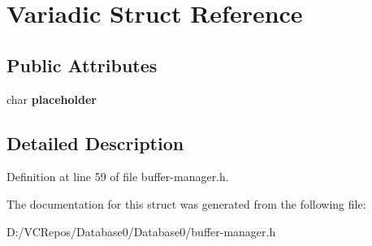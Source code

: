 \hypertarget{struct_variadic}{}\section{Variadic Struct Reference}
\label{struct_variadic}
\subsection*{Public Attributes}
\begin{DoxyCompactItemize}
\item 
\mbox{\label{struct_variadic_a3b8707a90647c818a4d618225f72ed34}} 
char {\bfseries placeholder}
\end{DoxyCompactItemize}


\subsection{Detailed Description}


Definition at line 59 of file buffer-\/manager.\+h.



The documentation for this struct was generated from the following file\+:\begin{DoxyCompactItemize}
\item 
D\+:/\+V\+C\+Repos/\+Database0/\+Database0/buffer-\/manager.\+h\end{DoxyCompactItemize}
